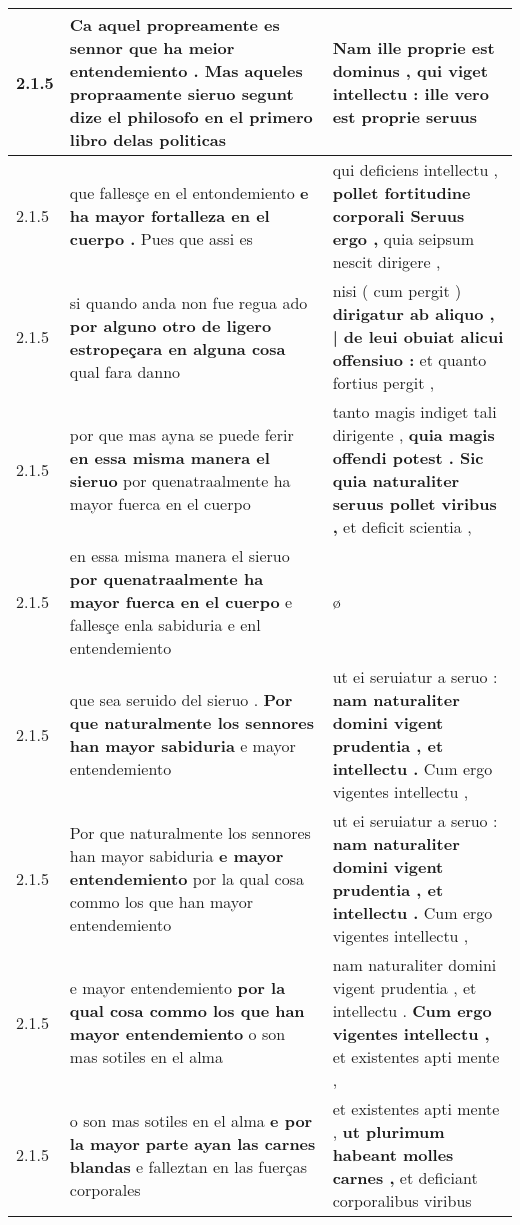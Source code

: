 \begin{tabular}{|p{1cm}|p{6.5cm}|p{6.5cm}|}
2.1.5 & Ca aquel propreamente es sennor \textbf{ que ha meior entendemiento . } Mas aqueles propraamente sieruo segunt dize el philosofo en el primero libro delas politicas & Nam ille proprie est dominus , \textbf{ qui viget intellectu : } ille vero est proprie seruus \\\hline
2.1.5 & que fallesçe en el entondemiento \textbf{ e ha mayor fortalleza en el cuerpo . } Pues que assi es & qui deficiens intellectu , \textbf{ pollet fortitudine corporali Seruus ergo , } quia seipsum nescit dirigere , \\\hline
2.1.5 & si quando anda non fue regua ado \textbf{ por alguno otro de ligero estropeçara en alguna cosa } qual fara danno & nisi ( cum pergit ) \textbf{ dirigatur ab aliquo , | de leui obuiat alicui offensiuo : } et quanto fortius pergit , \\\hline
2.1.5 & por que mas ayna se puede ferir \textbf{ en essa misma manera el sieruo } por quenatraalmente ha mayor fuerca en el cuerpo & tanto magis indiget tali dirigente , \textbf{ quia magis offendi potest . Sic quia naturaliter seruus pollet viribus , } et deficit scientia , \\\hline
2.1.5 & en essa misma manera el sieruo \textbf{ por quenatraalmente ha mayor fuerca en el cuerpo } e fallesçe enla sabiduria e enl entendemiento & ø \\\hline
2.1.5 & que sea seruido del sieruo . \textbf{ Por que naturalmente los sennores han mayor sabiduria } e mayor entendemiento & ut ei seruiatur a seruo : \textbf{ nam naturaliter domini vigent prudentia , et intellectu . } Cum ergo vigentes intellectu , \\\hline
2.1.5 & Por que naturalmente los sennores han mayor sabiduria \textbf{ e mayor entendemiento } por la qual cosa commo los que han mayor entendemiento & ut ei seruiatur a seruo : \textbf{ nam naturaliter domini vigent prudentia , et intellectu . } Cum ergo vigentes intellectu , \\\hline
2.1.5 & e mayor entendemiento \textbf{ por la qual cosa commo los que han mayor entendemiento } o son mas sotiles en el alma & nam naturaliter domini vigent prudentia , et intellectu . \textbf{ Cum ergo vigentes intellectu , } et existentes apti mente , \\\hline
2.1.5 & o son mas sotiles en el alma \textbf{ e por la mayor parte ayan las carnes blandas } e falleztan en las fuerças corporales & et existentes apti mente , \textbf{ ut plurimum habeant molles carnes , } et deficiant corporalibus viribus \\\hline

\end{tabular}
